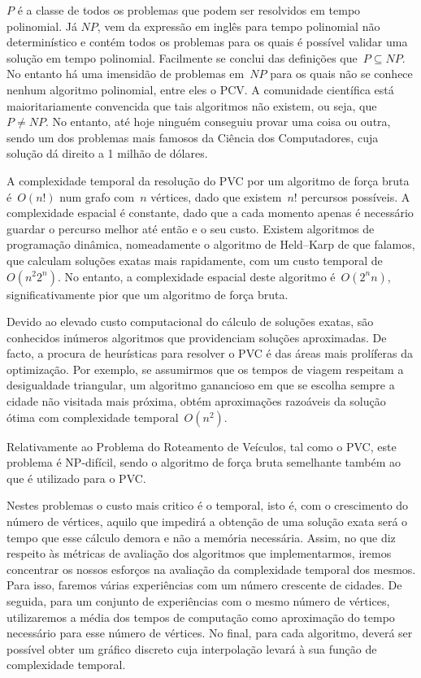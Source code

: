 \documentclass[12pt,a4paper,reqno]{report}
\numberwithin{figure}{section}
\numberwithin{equation}{section}
\begin{document}
$P$ é a classe de todos os problemas que podem ser resolvidos em tempo polinomial. Já $NP$, vem da expressão em inglês para tempo polinomial não determinístico e contém todos os problemas para os quais é possível validar uma solução em tempo polinomial. Facilmente se conclui das definições que~$P \subseteq NP$. No entanto há uma imensidão de problemas em~$NP$ para os quais não se conhece nenhum algoritmo polinomial, entre eles o PCV. A comunidade científica está maioritariamente convencida que tais algoritmos não existem, ou seja, que~$P \neq NP$. No entanto, até hoje ninguém conseguiu provar uma coisa ou outra, sendo um dos problemas mais famosos da Ciência dos Computadores, cuja solução dá direito a 1 milhão de dólares.

A complexidade temporal da resolução do PVC por um algoritmo de força bruta é~$O(n!)$ num grafo com~$n$ vértices, dado que existem~$n!$ percursos possíveis. A complexidade espacial é constante, dado que a cada momento apenas é necessário guardar o percurso melhor até então e o seu custo. Existem algoritmos de programação dinâmica, nomeadamente o algoritmo de Held–Karp de que falamos, que calculam soluções exatas mais rapidamente, com um custo temporal de~$O(n^2 2^n)$. No entanto, a complexidade espacial deste algoritmo é~$O(2^n n)$, significativamente pior que um algoritmo de força bruta.

Devido ao elevado custo computacional do cálculo de soluções exatas, são conhecidos inúmeros algoritmos que providenciam soluções aproximadas. De facto, a procura de heurísticas para resolver o PVC é das áreas mais prolíferas da optimização. Por exemplo, se assumirmos que os tempos de viagem respeitam a desigualdade triangular, um algoritmo ganancioso em que se escolha sempre a cidade não visitada mais próxima, obtém aproximações razoáveis da solução ótima com complexidade temporal~$O(n^2)$.

Relativamente ao Problema do Roteamento de Veículos, tal como o PVC, este problema é NP-difícil, sendo o algoritmo de força bruta semelhante também ao que é utilizado para o PVC.

Nestes problemas o custo mais critico é o temporal, isto é, com o crescimento do número de vértices, aquilo que impedirá a obtenção de uma solução exata será o tempo que esse cálculo demora e não a memória necessária. Assim, no que diz respeito às métricas de avaliação dos algoritmos que implementarmos, iremos concentrar os nossos esforços na avaliação da complexidade temporal dos mesmos. Para isso, faremos várias experiências com um número crescente de cidades. De seguida, para um conjunto de experiências com o mesmo número de vértices, utilizaremos a média dos tempos de computação como aproximação do tempo necessário para esse número de vértices. No final, para cada algoritmo, deverá ser possível obter um gráfico discreto cuja interpolação levará à sua função de complexidade temporal.
\end{document}
